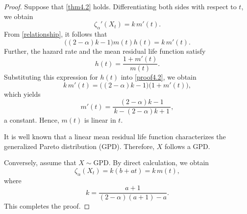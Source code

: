 \documentclass[11pt,reqno]{amsart}
\theoremstyle{tight}
\begin{document}
\begin{proof}
Suppose that \eqref{thm4.2} holds. Differentiating both sides with respect to $t$, we obtain
\[
\zeta_{\alpha}'(X_t)=k\,m'(t).
\]
From \eqref{relationship}, it follows that
\begin{equation}\label{proof4.2}
\bigl((2-\alpha)k-1\bigr)m(t)h(t)=k\,m'(t).
\end{equation}
Further, the hazard rate and the mean residual life function satisfy
\[
h(t)=\frac{1+m'(t)}{m(t)}.
\]
Substituting this expression for $h(t)$ into \eqref{proof4.2}, we obtain
\[
k\,m'(t)=\bigl((2-\alpha)k-1\bigr)\bigl(1+m'(t)\bigr),
\]
which yields
\[
m'(t)=\frac{(2-\alpha)k-1}{\,k-(2-\alpha)k+1\,},
\]
a constant. Hence, $m(t)$ is linear in $t$.

It is well known that a linear mean residual life function characterizes the
generalized Pareto distribution (GPD). Therefore, $X$ follows a GPD.

Conversely, assume that $X\sim\mathrm{GPD}$. By direct calculation, we obtain
\[
\zeta_{\alpha}(X_t)=k(b+at)=k\,m(t),
\]
where
\[
k=\frac{a+1}{(2-\alpha)(a+1)-a}.
\]
This completes the proof.
\end{proof}
\end{document}
